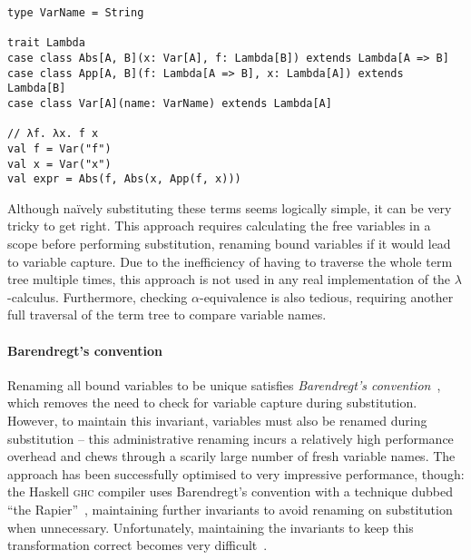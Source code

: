 \documentclass[../../../main.tex]{subfiles}
\begin{document}
\begin{verbatim}
type VarName = String

trait Lambda
case class Abs[A, B](x: Var[A], f: Lambda[B]) extends Lambda[A => B]
case class App[A, B](f: Lambda[A => B], x: Lambda[A]) extends Lambda[B]
case class Var[A](name: VarName) extends Lambda[A]

// λf. λx. f x
val f = Var("f")
val x = Var("x")
val expr = Abs(f, Abs(x, App(f, x)))
\end{verbatim}
%
Although naïvely substituting these terms seems logically simple, it can be very tricky to get right.
This approach requires calculating the free variables in a scope before performing substitution, renaming bound variables if it would lead to variable capture.
Due to the inefficiency of having to traverse the whole term tree multiple times, this approach is not used in any real implementation of the $\lambda$-calculus.
Furthermore, checking $\alpha$-equivalence is also tedious, requiring another full traversal of the term tree to compare variable names.

\paragraph{Barendregt's convention}
Renaming all bound variables to be unique satisfies \emph{Barendregt's convention}~\cite{barendregt_lambda_1984}, which removes the need to check for variable capture during substitution.
However, to maintain this invariant, variables must also be renamed during substitution -- this administrative renaming incurs a relatively high performance overhead and chews through a scarily large number of fresh variable names.
The approach has been successfully optimised to very impressive performance, though:
the Haskell \textsc{ghc} compiler uses Barendregt's convention with a technique dubbed ``the Rapier''~\cite{peytonjones_secrets_2002}, maintaining further invariants to avoid renaming on substitution when unnecessary.
Unfortunately, maintaining the invariants to keep this transformation correct becomes very difficult~\cite{maclaurin_thefoil_2023}.
\end{document}
